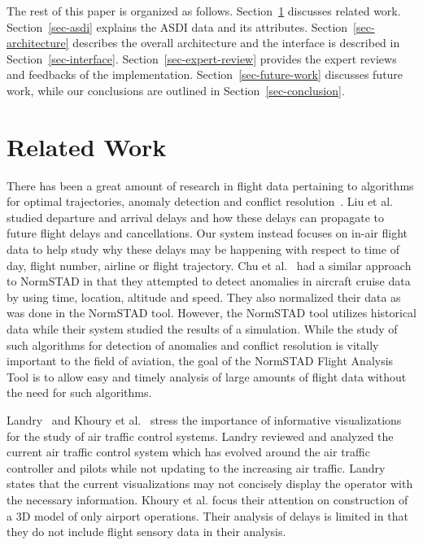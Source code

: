 \documentclass{sig-alternate}
\begin{document}
The rest of this paper is organized as follows. Section~\ref{sec-related-work}
discusses related
work. Section~\ref{sec-asdi} explains the ASDI data and its attributes. 
Section~\ref{sec-architecture} describes
the overall architecture and the interface is described in Section~\ref{sec-interface}.
Section~\ref{sec-expert-review}
provides the expert reviews
and feedbacks of the implementation. Section~\ref{sec-future-work}
discusses future work, while our conclusions
are outlined in Section~\ref{sec-conclusion}.

\section{Related Work}
\label{sec-related-work}

There has been a great amount of research in flight data pertaining to algorithms
for optimal trajectories, anomaly detection and conflict 
resolution~\cite{Basu09, Cao06, Chu10, Liu08, Rama06, Wang04}.
Liu et al.~\cite{Liu08} studied departure and arrival delays and how these delays
can propagate to future flight delays and cancellations. Our system instead focuses
on in-air flight data to help study why these delays may be happening with 
respect to time of day, flight number, airline or flight trajectory. 
Chu et al.~\cite{Chu10} had a similar approach to NormSTAD in that they
attempted to detect anomalies in aircraft cruise data by using time, location, altitude 
and speed. They also normalized their data as was done in the NormSTAD tool. However,
the NormSTAD tool utilizes historical data while their system studied the results
of a simulation. While the study of such algorithms for detection of anomalies and conflict
resolution is vitally important to the field of aviation, the goal of the NormSTAD Flight Analysis 
Tool is to allow easy and timely analysis of large amounts of flight data without the need
for such algorithms.

Landry~\cite{Landry11} and Khoury et al.~\cite{Khoury06} stress the importance
of informative visualizations for the study of air traffic control systems.
Landry reviewed and analyzed the current air traffic control system which 
has evolved around the air traffic controller and pilots while not 
updating to the increasing air traffic. Landry states that the 
current visualizations may not concisely display the operator with the 
necessary information. Khoury et al. focus their attention on 
construction of a 3D model of only airport operations. Their analysis of delays
is limited in that they do not include flight sensory data in their analysis.
\end{document}
